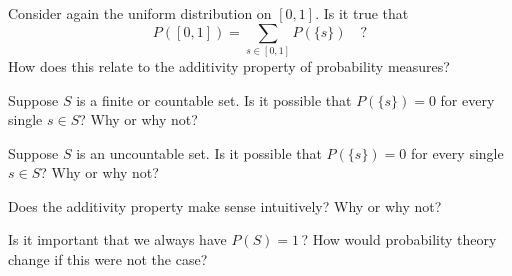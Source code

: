 \begin{problems}
    \item Consider again the uniform distribution on $[0,1]$. Is it true that
    $$
    P([0,1]) = \sum_{s \in[0,1]}P(\{s\})\quad\text{?}
    $$
    How does this relate to the additivity property of probability measures?
    \item Suppose $S$ is a finite or countable set. Is it possible that $P(\{s\})=0$ for every single $s\in{}S$? Why
    or why not?
    \item Suppose $S$ is an uncountable set. Is it possible that $P(\{s\})=0$ for every single $s\in S$? Why or why
    not?
\end{problems}

\begin{discussion}
    \item Does the additivity property make sense intuitively? Why or why not?
    \item Is it important that we always have $P(S)=1$\,? How would probability theory change if this were not the
    case?
\end{discussion}